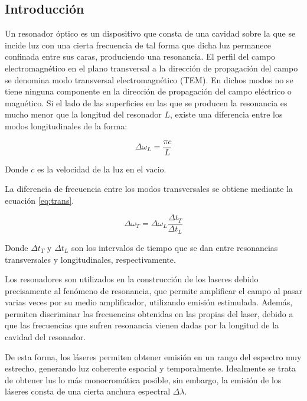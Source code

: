 \documentclass[twoside]{article}
\begin{document}
	\begin{multicols}{2} %

		\section{Introducción} %
							 
			Un resonador óptico es un dispositivo que consta de una cavidad sobre la que se incide luz con una cierta frecuencia de tal forma que dicha luz permanece confinada entre sus caras, produciendo una resonancia. El perfil del campo electromagnético en el plano transversal a la dirección de propagación del campo se denomina modo transversal electromagnético (TEM). En dichos modos no se tiene ninguna componente en la dirección de propagación del campo eléctrico o magnético. Si el lado de las superficies en las que se producen la resonancia es mucho menor que la longitud del resonador $L$, existe una diferencia entre los modos longitudinales de la forma:

				\begin{equation}
					\Delta \omega_L = \frac{\pi c}{L}
					\label{eq:long}
				\end{equation}

			Donde $c$ es la velocidad de la luz en el vacio.

			La diferencia de frecuencia entre los modos transversales se obtiene mediante la ecuación \ref{eq:trans}.

				\begin{equation}
					\Delta \omega_T = \Delta \omega_L \frac{\Delta t_T}{\Delta t_L}
					\label{eq:trans}
				\end{equation}

			Donde $\Delta t_T$ y $\Delta t_L$ son los intervalos de tiempo que se dan entre resonancias transversales y longitudinales, respectivamente.

			Los resonadores son utilizados en la construcción de los laseres debido precisamente al fenómeno de resonancia, que permite amplificar el campo al pasar varias veces por su medio amplificador, utilizando emisión estimulada. Además, permiten discriminar las frecuencias obtenidas en las propias del laser, debido a que las frecuencias que sufren resonancia vienen dadas por la longitud de la cavidad del resonador.

			De esta forma, los láseres permiten obtener emisión en un rango del espectro muy estrecho, generando luz coherente espacial y temporalmente. Idealmente se trata de obtener lus lo más monocromática posible, sin embargo, la emisión de los láseres consta de una cierta anchura espectral $\Delta \lambda$.


\end{multicols}
\end{document}
